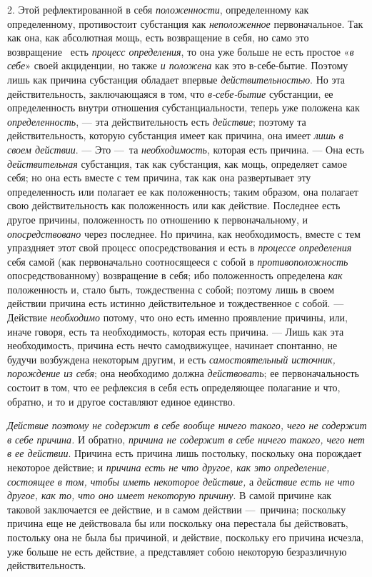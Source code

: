 2. Этой рефлектированной в себя {\em положенности},
определенному как определенному, противостоит субстанция как
{\em неположенное} первоначальное. Так как она, как
абсолютная мощь, есть возвращение в себя, но само это возвращение \ есть
{\em процесс определения}, то она уже больше не есть
простое «{\em в себе}» своей акциденции, но также
{\em и положена} как это в-себе-бытие. Поэтому лишь как
причина субстанция обладает впервые
{\em действительностью}. Но эта действительность,
заключающаяся в том, что {\em в-себе-бытие} субстанции,
ее определенность внутри отношения субстанциальности, теперь уже положена
как {\em определенность}, — эта действительность есть
{\em действие}; поэтому та действительность, которую
субстанция имеет как причина, она имеет {\em лишь в
своем действии}. — Это —~та {\em необходимость},
которая есть причина. — Она есть {\em действительная}
субстанция, так как субстанция, как мощь, определяет самое себя; но она
есть вместе с тем причина, так как она развертывает эту определенность или
полагает ее как положенность; таким образом, она полагает свою
действительность как положенность или как действие. Последнее есть другое
причины, положенность по отношению к первоначальному, и
{\em опосредствовано} через последнее. Но причина, как
необходимость, вместе с тем упраздняет этот свой процесс опосредствования и
есть в {\em процессе определения} себя самой (как
первоначально соотносящееся с собой в
{\em противоположность} опосредствованному) возвращение
в себя; ибо положенность определена {\em как}
положенность и, стало быть, тождественна с собой; поэтому лишь в своем
действии причина есть истинно действительное и тождественное с собой. —
Действие {\em необходимо} потому, что оно есть именно
проявление причины, или, иначе говоря, есть та необходимость, которая есть
причина. — Лишь как эта необходимость, причина есть нечто самодвижущее,
начинает спонтанно, не будучи возбуждена некоторым другим, и есть
{\em самостоятельный источник, порождение из себя}; она
необходимо должна {\em действовать}; ее
первоначальность состоит в том, что ее рефлексия в себя есть определяющее
полагание и что, обратно, и то и другое составляют единое единство.

{\em Действие поэтому не содержит в себе вообще ничего
такого, чего не содержит в себе причина.} И обратно,
{\em причина не содержит в себе ничего такого, чего нет
в ее действии}. Причина есть причина лишь постольку, поскольку она
порождает некоторое действие; и {\em причина есть не
что другое, как это определение, состоящее в том, чтобы иметь некоторое
действие, }а {\em действие есть не что другое, как то,
что оно имеет некоторую причину}. В самой причине как таковой заключается
ее действие, и в самом действии —~причина; поскольку причина еще не
действовала бы или поскольку она перестала бы действовать, постольку она не
была бы причиной, и действие, поскольку его причина исчезла, уже больше не
есть действие, а представляет собою некоторую безразличную
действительность.

